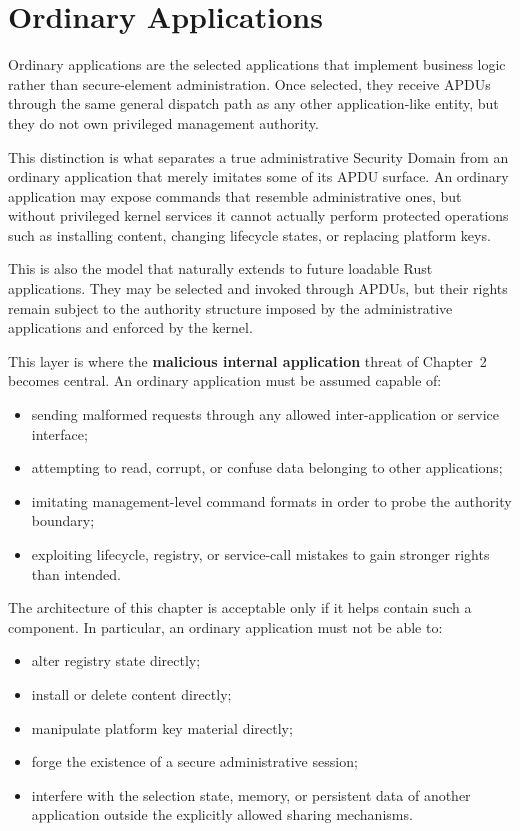 \section{Ordinary Applications}
\label{sec:system-ordinary-apps}


Ordinary applications are the selected applications that implement business
logic rather than secure-element administration. Once selected, they receive APDUs
through the same general dispatch path as any other application-like
entity, but they do not own privileged management authority.

This distinction is what separates a true administrative Security Domain
from an ordinary application that merely imitates some of its APDU
surface. An ordinary application may expose commands that resemble
administrative ones, but without privileged kernel services it cannot
actually perform protected operations such as installing content,
changing lifecycle states, or replacing platform keys.

This is also the model that naturally extends to future loadable Rust
applications. They may be selected and invoked through APDUs, but their
rights remain subject to the authority structure imposed by the
administrative applications and enforced by the kernel.

This layer is where the \textbf{malicious internal application} threat of
Chapter~2 becomes central. An ordinary application must be assumed
capable of:
\begin{itemize}
\item sending malformed requests through any allowed inter-application or
  service interface;
\item attempting to read, corrupt, or confuse data belonging to other
  applications;
\item imitating management-level command formats in order to probe the
  authority boundary;
\item exploiting lifecycle, registry, or service-call mistakes to gain
  stronger rights than intended.
\end{itemize}

The architecture of this chapter is acceptable only if it helps contain
such a component. In particular, an ordinary application must not be able
to:
\begin{itemize}
\item alter registry state directly;
\item install or delete content directly;
\item manipulate platform key material directly;
\item forge the existence of a secure administrative session;
\item interfere with the selection state, memory, or persistent data of
  another application outside the explicitly allowed sharing mechanisms.
\end{itemize}

